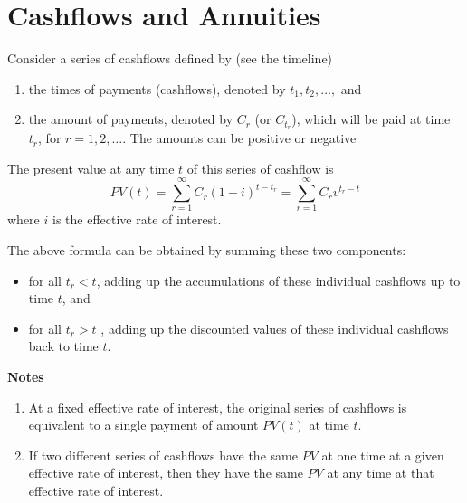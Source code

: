 \documentclass[
]{book}
\theoremstyle{definition}
\theoremstyle{definition}
\theoremstyle{definition}
\theoremstyle{definition}
\theoremstyle{remark}
\begin{document}
\hypertarget{cashflows-and-annuities}{%
\section{Cashflows and Annuities}\label{cashflows-and-annuities}}

Consider a series of cashflows defined by (see the timeline)

\begin{enumerate}
\def\labelenumi{\arabic{enumi}.}
\item
  the times of payments (cashflows), denoted by \(t_1, t_2, \ldots,\)
  and
\item
  the amount of payments, denoted by \(C_{r}\) (or \(C_{t_r}\)), which
  will be paid at time \(t_r\), for \(r = 1,2, \ldots\). The amounts can
  be positive or negative
\end{enumerate}

The present value at any time \(t\) of this series of cashflow is
\[PV(t) = \sum_{r=1}^\infty C_r (1 + i)^{t - t_r} = \sum_{r=1}^\infty C_r v^{t _r - t}\]
where \(i\) is the effective rate of interest.

The above formula can be obtained by summing these two components:

\begin{itemize}
\item
  for all \(t_r < t\), adding up the accumulations of these individual
  cashflows up to time \(t\), and
\item
  for all \(t_r > t\) , adding up the discounted values of these
  individual cashflows back to time \(t\).
\end{itemize}

\textbf{Notes}

\begin{enumerate}
\def\labelenumi{\arabic{enumi}.}
\item
  At a fixed effective rate of interest, the original series of
  cashflows is equivalent to a single payment of amount \(PV(t)\) at
  time \(t\).
\item
  If two different series of cashflows have the same \(PV\) at one time
  at a given effective rate of interest, then they have the same \(PV\)
  at any time at that effective rate of interest.
\end{enumerate}
\end{document}

